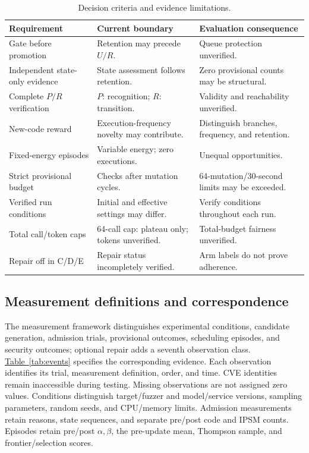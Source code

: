 \documentclass[final,5p,times,number]{elsarticle}
\newcommand{\namedref}[2]{\hyperref[#2]{#1~\ref*{#2}}}
\begin{document}
\begin{table}[!tbp]
\centering\small
\caption{Decision criteria and evidence limitations.}
\label{tab:implementation}
\begin{tabularx}{\textwidth}{Y Y Y}
\toprule
Requirement & Current boundary & Evaluation consequence \\
\midrule
Gate before promotion & Retention may precede $U/R$. & Queue protection unverified. \\
Independent state-only evidence & State assessment follows retention. & Zero provisional counts may be structural. \\
Complete $P/R$ verification & $P$: recognition; $R$: transition. & Validity and reachability unverified. \\
New-code reward & Execution-frequency novelty may contribute. & Distinguish branches, frequency, and retention. \\
Fixed-energy episodes & Variable energy; zero executions. & Unequal opportunities. \\
Strict provisional budget & Checks after mutation cycles. & 64-mutation/30-second limits may be exceeded. \\
Verified run conditions & Initial and effective settings may differ. & Verify conditions throughout each run. \\
Total call/token caps & 64-call cap: plateau only; tokens unverified. & Total-budget fairness unverified. \\
Repair off in C/D/E & Repair status incompletely verified. & Arm labels do not prove adherence. \\
\bottomrule
\end{tabularx}
\end{table}

\subsection{Measurement definitions and correspondence}
The measurement framework distinguishes experimental conditions, candidate generation, admission trials, provisional outcomes, scheduling episodes, and security outcomes; optional repair adds a seventh observation class. \namedref{Table}{tab:events} specifies the corresponding evidence. Each observation identifies its trial, measurement definition, order, and time. CVE identities remain inaccessible during testing. Missing observations are not assigned zero values. Conditions distinguish target/fuzzer and model/service versions, sampling parameters, random seeds, and CPU/memory limits. Admission measurements retain reasons, state sequences, and separate pre/post code and IPSM counts. Episodes retain pre/post $\alpha,\beta$, the pre-update mean, Thompson sample, and frontier/selection scores.
\end{document}
